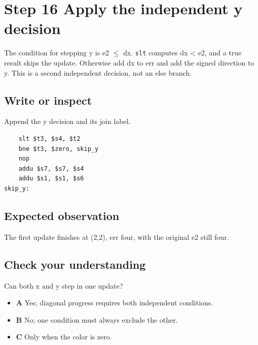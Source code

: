\section{Step 16 Apply the independent y
  decision}\label{007-bresenham-line-s16-step-16-apply-the-independent-y-decision}

The condition for stepping y is e2 \ensuremath{\leq} dx. \texttt{slt} computes dx
\textless{} e2, and a true result skips the update. Otherwise add dx to
err and add the signed direction to y. This is a second independent
decision, not an else branch.

\subsection{Write or
  inspect}\label{007-bresenham-line-s16-write-or-inspect}

Append the y decision and its join label.

\begin{verbatim}
    slt $t3, $s4, $t2
    bne $t3, $zero, skip_y
    nop
    addu $s7, $s7, $s4
    addu $s1, $s1, $s6
skip_y:
\end{verbatim}

\subsection{Expected
  observation}\label{007-bresenham-line-s16-expected-observation}

The first update finishes at (2,2), err four, with the original e2 still
four.

\subsection{Check your
  understanding}\label{007-bresenham-line-s16-check-your-understanding}

Can both x and y step in one update?

\begin{itemize}
  \tightlist
  \item
        \textbf{A} Yes; diagonal progress requires both independent
        conditions.
  \item
        \textbf{B} No; one condition must always exclude the other.
  \item
        \textbf{C} Only when the color is zero.
\end{itemize}
